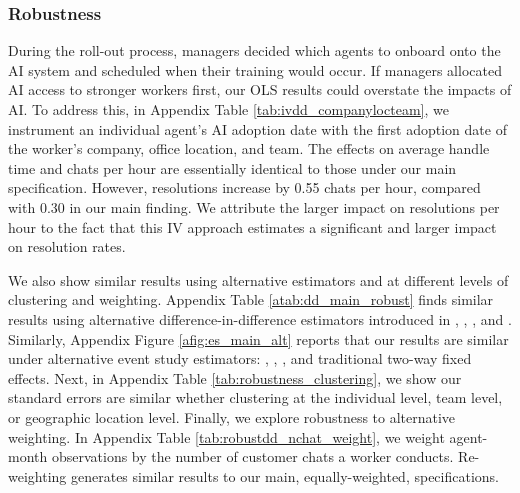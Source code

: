 \documentclass[11pt]{article}
\begin{document}
\subsubsection{Robustness} \label{sec:instrumentingadoption}

During the roll-out process, managers decided which agents to onboard onto the AI system and scheduled when their training would occur. If managers allocated AI access to stronger workers first, our OLS results could overstate the impacts of AI.  To address this, in Appendix Table \ref{tab:ivdd_companylocteam}, we instrument an individual agent's AI adoption date with the first adoption date of the worker's company,  office location, and team. The effects on average handle time and chats per hour are essentially identical to those under our main specification. However, resolutions increase by 0.55 chats per hour, compared with 0.30 in our main finding. We attribute the larger impact on resolutions per hour to the fact that this IV approach estimates a significant and larger impact on resolution rates.


We also show similar results using alternative estimators and at different levels of clustering and weighting. Appendix Table \ref{atab:dd_main_robust} finds similar results using alternative difference-in-difference estimators introduced in \citet{dechaisemartin2020}, \citet{sun_estimating_2020}, \citet{callaway_2021}, and \citet{borusyak2022revisiting}. Similarly, Appendix Figure \ref{afig:es_main_alt} reports that our results are similar under alternative event study estimators: \citet{dechaisemartin2020}, \citet{callaway_2021}, \citet{borusyak2022revisiting}, and traditional two-way fixed effects.  Next, in Appendix Table \ref{tab:robustness_clustering}, we show our standard errors are similar whether clustering at the individual level, team level, or geographic location level.  Finally, we explore robustness to alternative weighting.  In Appendix Table \ref{tab:robustdd_nchat_weight}, we weight agent-month observations by the number of customer chats a worker conducts. Re-weighting generates similar results to our main, equally-weighted, specifications. 
\end{document}
